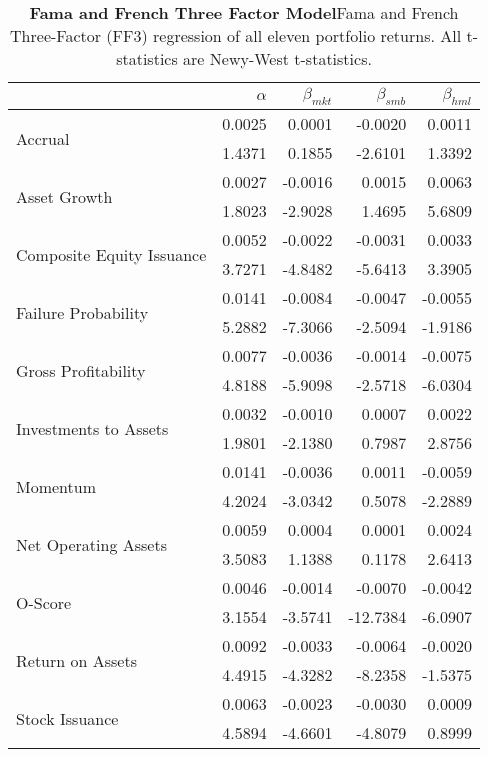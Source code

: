 \begin{table}[htbp]
\centering
\scriptsize
\caption[Fama and French Three Factor Model]{\textbf{Fama and French Three Factor Model}\newline Fama and French Three-Factor (FF3) regression of all eleven portfolio returns. All t-statistics are Newy-West t-statistics.}
\label{tab:ff3}
\begin{tabular}{@{}lrrrr@{}}
\toprule
& $\alpha$ & $\beta_{mkt}$ & $\beta_{smb}$ & $\beta_{hml}$ \\ \midrule
\multirow{2}{*}{Accrual} & 0.0025 & 0.0001 & -0.0020 & 0.0011 \\
& 1.4371 & 0.1855 & -2.6101 & 1.3392 \\
\multirow{2}{*}{Asset Growth} & 0.0027 & -0.0016 & 0.0015 & 0.0063 \\
& 1.8023 & -2.9028 & 1.4695 & 5.6809 \\
\multirow{2}{*}{Composite Equity Issuance} & 0.0052 & -0.0022 & -0.0031 & 0.0033 \\
& 3.7271 & -4.8482 & -5.6413 & 3.3905 \\
\multirow{2}{*}{Failure Probability} & 0.0141 & -0.0084 & -0.0047 & -0.0055 \\
& 5.2882 & -7.3066 & -2.5094 & -1.9186 \\
\multirow{2}{*}{Gross Profitability} & 0.0077 & -0.0036 & -0.0014 & -0.0075 \\
& 4.8188 & -5.9098 & -2.5718 & -6.0304 \\
\multirow{2}{*}{Investments to Assets} & 0.0032 & -0.0010 & 0.0007 & 0.0022 \\
& 1.9801 & -2.1380 & 0.7987 & 2.8756 \\
\multirow{2}{*}{Momentum} & 0.0141 & -0.0036 & 0.0011 & -0.0059 \\
& 4.2024 & -3.0342 & 0.5078 & -2.2889 \\
\multirow{2}{*}{Net Operating Assets} & 0.0059 & 0.0004 & 0.0001 & 0.0024 \\
& 3.5083 & 1.1388 & 0.1178 & 2.6413 \\
\multirow{2}{*}{O-Score} & 0.0046 & -0.0014 & -0.0070 & -0.0042 \\
& 3.1554 & -3.5741 & -12.7384 & -6.0907 \\
\multirow{2}{*}{Return on Assets} & 0.0092 & -0.0033 & -0.0064 & -0.0020 \\
& 4.4915 & -4.3282 & -8.2358 & -1.5375 \\
\multirow{2}{*}{Stock Issuance} & 0.0063 & -0.0023 & -0.0030 & 0.0009 \\
& 4.5894 & -4.6601 & -4.8079 & 0.8999 \\ \bottomrule
\end{tabular}
\end{table}

